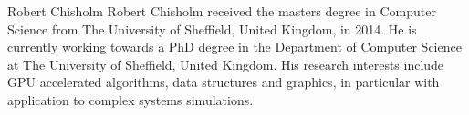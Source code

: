 \begin{IEEEbiography}{Robert Chisholm}
Robert Chisholm received the masters degree in Computer Science from The University of Sheffield, United Kingdom, in 2014. He is currently working towards a PhD degree in the Department of Computer Science at The University of Sheffield, United Kingdom. His research interests include GPU accelerated algorithms, data structures and graphics, in particular with application to complex systems simulations.
\end{IEEEbiography}